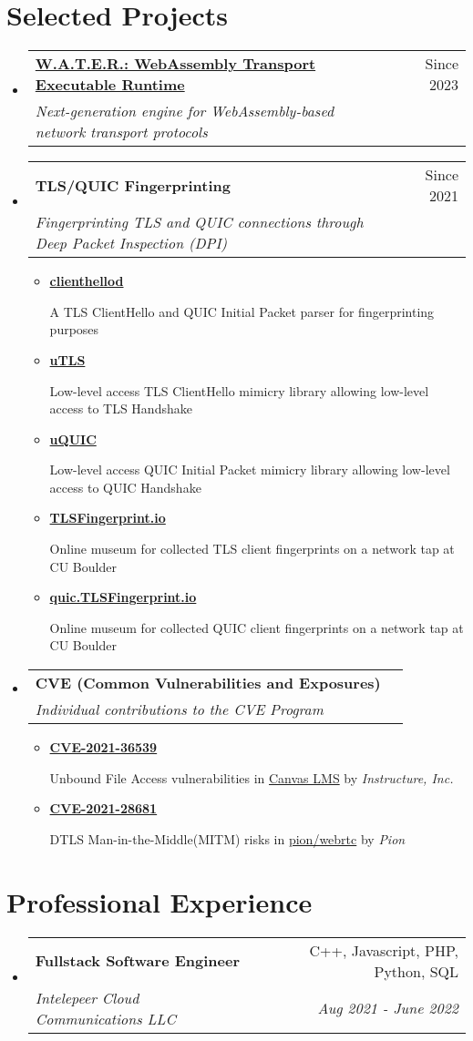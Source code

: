 \documentclass[letterpaper,11pt]{article}
\makeatletter
\newcommand{\resumeItem}[1]{
  \item\small{
    {#1 \vspace{-2pt}}
  }
}
\newcommand{\resumeSubheading}[4]{
  \vspace{-2pt}\item
    \begin{tabular*}{0.97\textwidth}[t]{l@{\extracolsep{\fill}}r}
      \textbf{#1} & #2 \\
      \textit{\small#3} & \textit{\small #4} \\
    \end{tabular*}\vspace{-7pt}
}
\newcommand{\resumeSubHeadingListStart}{\begin{itemize}[leftmargin=0.15in, label={}]}
\newcommand{\resumeSubHeadingListEnd}{\end{itemize}}
\newcommand{\resumeItemListStart}{\begin{itemize}}
\newcommand{\resumeItemListEnd}{\end{itemize}\vspace{-5pt}}
\makeatother
\begin{document}
\section{Selected Projects}
\resumeSubHeadingListStart
\resumeSubheading
{\href{https://github.com/gaukas/water}{\textbf{W.A.T.E.R.: WebAssembly Transport Executable Runtime}}}{Since 2023}
{Next-generation engine for WebAssembly-based network transport protocols}{}
\resumeSubheading
{\textbf{TLS/QUIC Fingerprinting}}{Since 2021}
{Fingerprinting TLS and QUIC connections through Deep Packet Inspection (DPI)}{}
\resumeItemListStart
  \resumeItem{\href{https://github.com/gaukas/clienthellod}{\textbf{clienthellod}}}
    {A TLS ClientHello and QUIC Initial Packet parser for fingerprinting purposes}
  \resumeItem{\href{https://github.com/refraction-networking/utls}{\textbf{uTLS}}}
    {Low-level access TLS ClientHello mimicry library allowing low-level access to TLS Handshake}
  \resumeItem{\href{https://github.com/refraction-networking/uquic}{\textbf{uQUIC}}}
    {Low-level access QUIC Initial Packet mimicry library allowing low-level access to QUIC Handshake}
  \resumeItem{\href{https://tlsfingerprint.io}{\textbf{TLSFingerprint.io}}}
    {Online museum for collected TLS client fingerprints on a network tap at CU Boulder}
  \resumeItem{\href{https://quic.tlsfingerprint.io}{\textbf{quic.TLSFingerprint.io}}}
    {Online museum for collected QUIC client fingerprints on a network tap at CU Boulder}  
\resumeItemListEnd
\resumeSubheading
{\textbf{CVE (Common Vulnerabilities and Exposures)}}{}
{Individual contributions to the CVE\textsuperscript{\textregistered} Program}{}
\resumeItemListStart
  \resumeItem{\href{https://www.cve.org/CVERecord?id=CVE-2021-36539}{\textbf{CVE-2021-36539}}}
    {Unbound File Access vulnerabilities in \href{https://www.instructure.com/canvas}{Canvas LMS} by \emph{Instructure, Inc.}}
  \resumeItem{\href{https://www.cve.org/CVERecord?id=CVE-2021-28681}{\textbf{CVE-2021-28681}}}
    {DTLS Man-in-the-Middle(MITM) risks in \href{https://github.com/pion/webrtc}{pion/webrtc} by \emph{Pion}}
\resumeItemListEnd
\resumeSubHeadingListEnd
\vspace{1pt}

\section{Professional Experience}
\resumeSubHeadingListStart
\resumeSubheading
{Fullstack Software Engineer}{C++, Javascript, PHP, Python, SQL}
{Intelepeer Cloud Communications LLC}{Aug 2021 - June 2022}
\resumeSubHeadingListEnd
\vspace{1pt}
\end{document}
